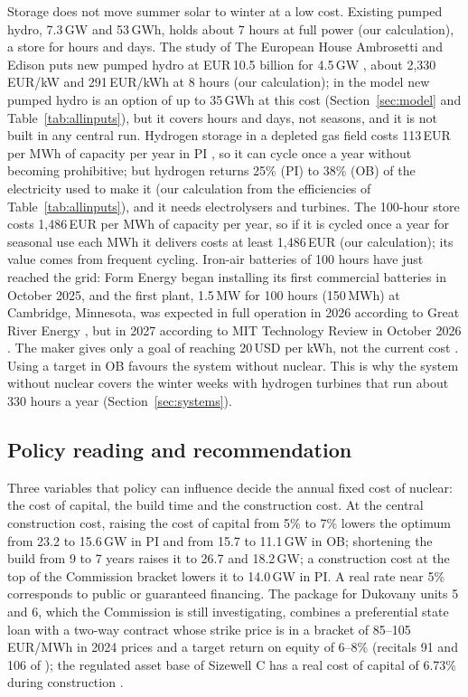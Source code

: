 Storage does not move summer solar to winter at a low cost. Existing pumped hydro, 7.3\,GW and 53\,GWh, holds about 7 hours at full power (our calculation), a store for hours and days. The study of The European House Ambrosetti and Edison puts new pumped hydro at EUR\,10.5 billion for 4.5\,GW \citep{EdisonPumped2023}, about 2{,}330\,EUR/kW and 291\,EUR/kWh at 8 hours (our calculation); in the model new pumped hydro is an option of up to 35\,GWh at this cost (Section~\ref{sec:model} and Table~\ref{tab:allinputs}), but it covers hours and days, not seasons, and it is not built in any central run. Hydrogen storage in a depleted gas field costs 113\,EUR per MWh of capacity per year in PI \citep{HystoriesD86}, so it can cycle once a year without becoming prohibitive; but hydrogen returns 25\% (PI) to 38\% (OB) of the electricity used to make it (our calculation from the efficiencies of Table~\ref{tab:allinputs}), and it needs electrolysers and turbines. The 100-hour store costs 1{,}486\,EUR per MWh of capacity per year, so if it is cycled once a year for seasonal use each MWh it delivers costs at least 1{,}486\,EUR (our calculation); its value comes from frequent cycling. Iron-air batteries of 100 hours have just reached the grid: Form Energy began installing its first commercial batteries in October 2025, and the first plant, 1.5\,MW for 100 hours (150\,MWh) at Cambridge, Minnesota, was expected in full operation in 2026 according to Great River Energy \citep{GRE2025}, but in 2027 according to MIT Technology Review in October 2026 \citep{MITTR2026}. The maker gives only a goal of reaching 20\,USD per kWh, not the current cost \citep{MITTR2026}. Using a target in OB favours the system without nuclear. This is why the system without nuclear covers the winter weeks with hydrogen turbines that run about 330 hours a year (Section~\ref{sec:systems}).


\subsection{Policy reading and recommendation}\label{sec:policy}
Three variables that policy can influence decide the annual fixed cost of nuclear: the cost of capital, the build time and the construction cost. At the central construction cost, raising the cost of capital from 5\% to 7\% lowers the optimum from 23.2 to 15.6\,GW in PI and from 15.7 to 11.1\,GW in OB; shortening the build from 9 to 7 years raises it to 26.7 and 18.2\,GW; a construction cost at the top of the Commission bracket lowers it to 14.0\,GW in PI. A real rate near 5\% corresponds to public or guaranteed financing. The package for Dukovany units 5 and 6, which the Commission is still investigating, combines a preferential state loan with a two-way contract whose strike price is in a bracket of 85--105\,EUR/MWh in 2024 prices and a target return on equity of 6--8\% (recitals 91 and 106 of \citealp{ECDukovany2026}); the regulated asset base of Sizewell C has a real cost of capital of 6.73\% during construction \citep{NAOSizewell2026}.

